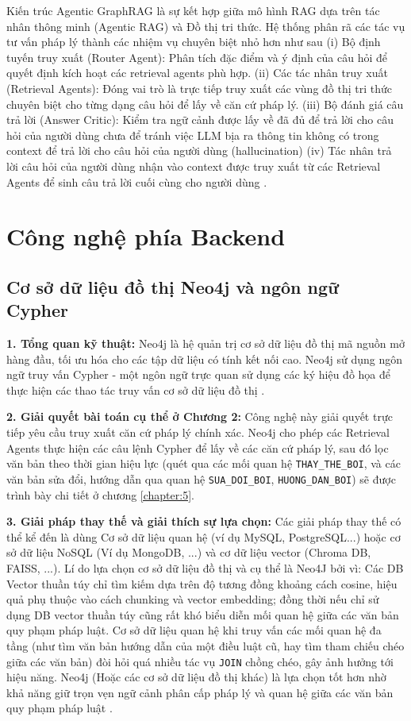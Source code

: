 \documentclass[../DoAn.tex]{subfiles}
\begin{document}
Kiến trúc Agentic GraphRAG là sự kết hợp giữa mô hình RAG dựa trên tác nhân thông minh (Agentic RAG) và Đồ thị tri thức. Hệ thống phân rã các tác vụ tư vấn pháp lý thành các nhiệm vụ chuyên biệt nhỏ hơn như sau (i) Bộ định tuyến truy xuất (Router Agent): Phân tích đặc điểm và ý định của câu hỏi để quyết định kích hoạt các retrieval agents phù hợp.
(ii) Các tác nhân truy xuất (Retrieval Agents): Đóng vai trò là trực tiếp truy xuất các vùng đồ thị tri thức chuyên biệt cho từng dạng câu hỏi để lấy về căn cứ pháp lý. (iii) Bộ đánh giá câu trả lời (Answer Critic): Kiểm tra ngữ cảnh được lấy về đã đủ để trả lời cho câu hỏi của người dùng chưa để tránh việc LLM bịa ra thông tin không có trong context để trả lời cho câu hỏi của người dùng (hallucination) (iv) Tác nhân trả lời câu hỏi của người dùng nhận vào context được truy xuất từ các Retrieval Agents để sinh câu trả lời cuối cùng cho người dùng \cite{bratanic2025essential}. 

\section{Công nghệ phía Backend}
\label{section:3.2}

\subsection{Cơ sở dữ liệu đồ thị Neo4j và ngôn ngữ Cypher}
\label{subsection:3.2.1}

\textbf{1. Tổng quan kỹ thuật:} Neo4j là hệ quản trị cơ sở dữ liệu đồ thị mã nguồn mở hàng đầu, tối ưu hóa cho các tập dữ liệu có tính kết nối cao. Neo4j sử dụng ngôn ngữ truy vấn Cypher - một ngôn ngữ trực quan sử dụng các ký hiệu đồ họa để thực hiện các thao tác truy vấn cơ sở dữ liệu đồ thị \cite{10162641}.

\textbf{2. Giải quyết bài toán cụ thể ở Chương 2:} Công nghệ này giải quyết trực tiếp yêu cầu truy xuất căn cứ pháp lý chính xác. Neo4j cho phép các Retrieval Agents thực hiện các câu lệnh Cypher để lấy về các căn cứ pháp lý, sau đó lọc văn bản theo thời gian hiệu lực (quét qua các mối quan hệ \texttt{THAY\_THE\_BOI}, và các văn bản sửa đổi, hướng dẫn qua quan hệ \texttt{SUA\_DOI\_BOI}, \texttt{HUONG\_DAN\_BOI}) sẽ được trình bày chi tiết ở chương \ref{chapter:5}. 

\textbf{3. Giải pháp thay thế và giải thích sự lựa chọn:} Các giải pháp thay thế có thể kể đến là dùng Cơ sở dữ liệu quan hệ (ví dụ MySQL, PostgreSQL...) hoặc cơ sở dữ liệu NoSQL (Ví dụ MongoDB, ...) và cơ dữ liệu vector (Chroma DB, FAISS, ...). Lí do lựa chọn cơ sở dữ liệu đồ thị và cụ thể là Neo4J bởi vì: Các DB Vector thuần túy chỉ tìm kiếm dựa trên độ tương đồng khoảng cách cosine, hiệu quả phụ thuộc vào cách chunking và vector embedding; đồng thời nếu chỉ sử dụng DB vector thuần túy cũng rất khó biểu diễn mối quan hệ giữa các văn bản quy phạm pháp luật. Cơ sở dữ liệu quan hệ khi truy vấn các mối quan hệ đa tầng (như tìm văn bản hướng dẫn của một điều luật cũ, hay tìm tham chiếu chéo giữa các văn bản) đòi hỏi quá nhiều tác vụ \texttt{JOIN} chồng chéo, gây ảnh hưởng tới hiệu năng. Neo4j (Hoặc các cơ sở dữ liệu đồ thị khác) là lựa chọn tốt hơn nhờ khả năng giữ trọn vẹn ngữ cảnh phân cấp pháp lý và quan hệ giữa các văn bản quy phạm pháp luật \cite{9631310}. 
\end{document}
